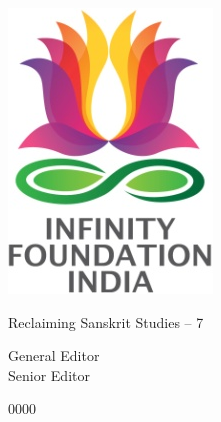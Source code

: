 \thispagestyle{empty}

\includegraphics{images/logo.png}

Reclaiming Sanskrit Studies – 7


General Editor\\

Senior Editor\\


0000

